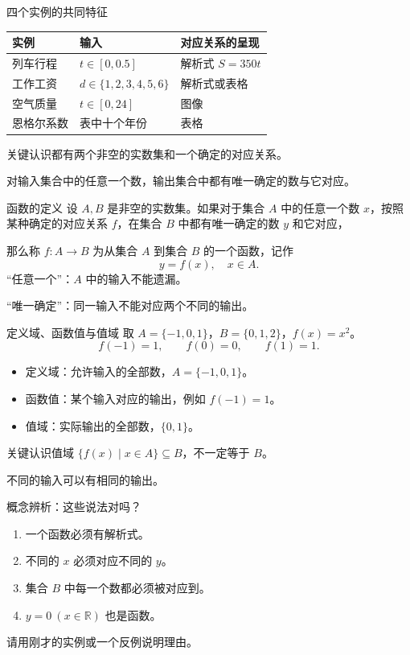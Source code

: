 \documentclass[aspectratio=169,10pt]{beamer}
\newcommand{\R}{\mathbb R}
\newcommand{\src}[1]{}
\newcommand{\key}[1]{\begin{block}{关键认识}#1\end{block}}
\begin{document}
\begin{frame}[t]{四个实例的共同特征}
\begin{center}\small
\begin{tabular}{lll}
\toprule
实例&输入&对应关系的呈现\\\midrule
列车行程&$t\in[0,0.5]$&解析式 $S=350t$\\
工作工资&$d\in\{1,2,3,4,5,6\}$&解析式或表格\\
空气质量&$t\in[0,24]$&图像\\
恩格尔系数&表中十个年份&表格\\\bottomrule
\end{tabular}
\end{center}
\key{都有两个非空的实数集和一个确定的对应关系。\par
对输入集合中的任意一个数，输出集合中都有唯一确定的数与它对应。}
\src{教材第60—62页归纳。}
\end{frame}
\begin{frame}[t]{函数的定义}
设 $A,B$ 是\alert{非空的实数集}。如果对于集合 $A$ 中的\alert{任意一个}数 $x$，按照某种确定的对应关系 $f$，在集合 $B$ 中都有\alert{唯一确定}的数 $y$ 和它对应，\par\medskip
那么称 $f:A\to B$ 为从集合 $A$ 到集合 $B$ 的一个函数，记作
\[\boxed{y=f(x),\quad x\in A.}\]
\medskip
“任意一个”：$A$ 中的输入不能遗漏。\par
“唯一确定”：同一输入不能对应两个不同的输出。
\src{教材第62页函数定义。$f(x)$ 表示函数值，不是 $f$ 与 $x$ 相乘。}
\end{frame}
\begin{frame}[t]{定义域、函数值与值域}
取 $A=\{-1,0,1\}$，$B=\{0,1,2\}$，$f(x)=x^2$。
\[f(-1)=1,\qquad f(0)=0,\qquad f(1)=1.\]
\begin{itemize}
\item 定义域：允许输入的全部数，$A=\{-1,0,1\}$。
\item 函数值：某个输入对应的输出，例如 $f(-1)=1$。
\item 值域：实际输出的全部数，$\{0,1\}$。
\end{itemize}
\key{值域 $\{f(x)\mid x\in A\}\subseteq B$，不一定等于 $B$。\par
不同的输入可以有相同的输出。}
\src{依据教材定义自编。}
\end{frame}
\begin{frame}[t]{概念辨析：这些说法对吗？}
\begin{enumerate}
\item 一个函数必须有解析式。
\item 不同的 $x$ 必须对应不同的 $y$。
\item 集合 $B$ 中每一个数都必须被对应到。
\item $y=0\ (x\in\R)$ 也是函数。
\end{enumerate}
\bigskip
请用刚才的实例或一个反例说明理由。
\src{依据函数定义自编。}
\end{frame}
\end{document}
